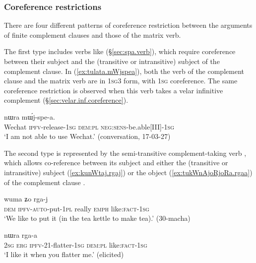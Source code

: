  \subsubsection{Coreference restrictions} \label{sec:finite.complement.coref}
There are four different patterns of coreference restriction between the arguments of finite complement clauses and those of the matrix verb.

The first type includes verbs like  (§\ref{sec:spa.verb}), which require coreference between their subject and the (transitive or intransitive) subject of the complement clause. In (\ref{ex:tulata.mWjspea}), both the verb of the complement clause and the matrix verb are in \textsc{1sg}\fl{}3 form, with \textsc{1sg} coreference. The same coreference restriction is observed when this verb takes a velar infinitive complement (§\ref{sec:velar.inf.coreference}).
 
\begin{exe}
\ex \label{ex:tulata.mWjspea}
  nɯra mɯ́j-spe-a. \\
 Wechat \textsc{ipfv}-release-\textsc{1sg} \textsc{dem}:\textsc{pl} \textsc{neg}:\textsc{sens}-be.able[III]-\textsc{1sg} \\
 \glt `I am not able to use Wechat.' (conversation, 17-03-27)
  \end{exe}
 
The second type is represented by the semi-transitive com\-ple\-ment-taking verb , which allows co-reference between its subject and either the (transitive or intransitive) subject (\ref{ex:kunWtaj.rgaj}) or the object (\ref{ex:tukWnAjoRjoRa.rgaa}) of the complement clause \citep[238]{jacques16complementation}. 
   
\begin{exe}
\ex \label{ex:kunWtaj.rgaj}
 \gll [nɯ ku-nɯ-ta-j] wuma ʑo rga-j   \\
 \textsc{dem} \textsc{ipfv}-\textsc{auto}-put-\textsc{1pl} really \textsc{emph} like:\textsc{fact}-\textsc{1sg} \\
 \glt `We like to put it (in the tea kettle to make tea).' (30-macha)
\end{exe}
     
 \begin{exe}
\ex \label{ex:tukWnAjoRjoRa.rgaa}
  nɯra rga-a \\
 \textsc{2sg} \textsc{erg} \textsc{ipfv}-2\fl{}1-flatter-\textsc{1sg} \textsc{dem}:\textsc{pl}  like:\textsc{fact}-\textsc{1sg}\\
\glt `I like it when you flatter me.' (elicited)
 \end{exe}
 
